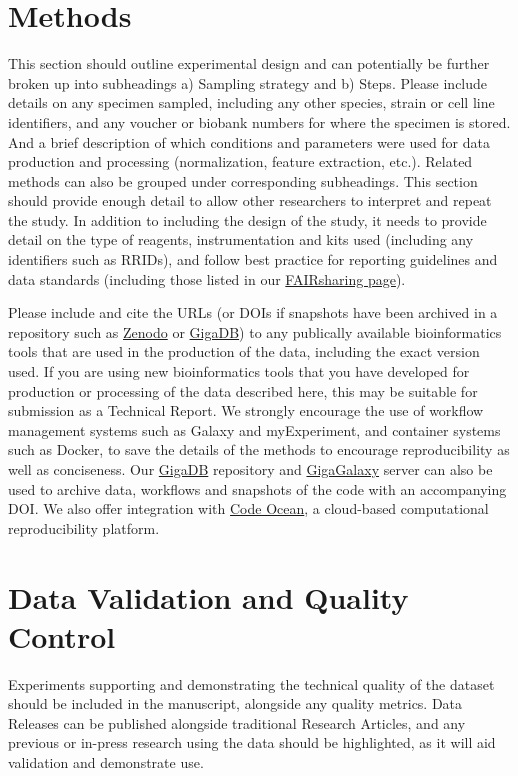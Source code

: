 \documentclass[a4paper,num-refs,gigabyte]{oup-contemporary}
\begin{document}
\section{Methods}

This section should outline experimental design and can potentially be further broken up into subheadings a) Sampling strategy and b) Steps. Please include details on any specimen sampled, including any other species, strain or cell line identifiers, and any voucher or biobank numbers for where the specimen is stored. And a brief description of which conditions and parameters were used for data production and processing (normalization, feature extraction, etc.). Related methods can also be grouped under corresponding subheadings. This section should provide enough detail to allow other researchers to interpret and repeat the study. In addition to including the design of the study, it needs to provide detail on the type of reagents, instrumentation and kits used (including any identifiers such as RRIDs), and follow best practice for reporting guidelines and data standards (including those listed in our \href{http://dx.doi.org/10.25504/FAIRsharing.prdtva}{FAIRsharing page}).

Please include and cite the URLs (or DOIs if snapshots have been archived in a repository such as \href{http://gigadb.org/site/term}{Zenodo} or \href{http://gigadb.org/}{GigaDB}) to any publically available bioinformatics tools that are used in the production of the data, including the exact version used. If you are using new bioinformatics tools that you have developed for production or processing of the data described here, this may be suitable for submission as a Technical Report. We strongly encourage the use of workflow management systems such as Galaxy and myExperiment, and container systems such as Docker, to save the details of the methods to encourage reproducibility as well as conciseness. Our \href{http://gigadb.org}{GigaDB} repository and \href{http://gigagalaxy.net}{GigaGalaxy} server can also be used to archive data, workflows and snapshots of the code with an accompanying DOI. We also offer integration with \href{http://gigadb.org/site/term}{Code Ocean}, a cloud-based computational reproducibility platform.

\section{Data Validation and Quality Control}

Experiments supporting and demonstrating the technical quality of the dataset should be included in the manuscript, alongside any quality metrics. Data Releases can be published alongside traditional Research Articles, and any previous or in-press research using the data should be highlighted, as it will aid validation and demonstrate use.
\end{document}
